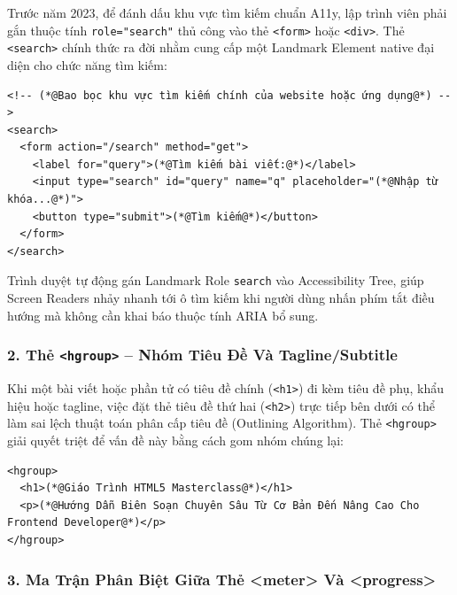 \documentclass[11pt,oneside]{book}
\newcommand{\codeinline}[1]{\textcolor{accentOrange}{\texttt{#1}}}
\begin{document}
Trước năm 2023, để đánh dấu khu vực tìm kiếm chuẩn A11y, lập trình viên phải gắn thuộc tính \codeinline{role="search"} thủ công vào thẻ \codeinline{<form>} hoặc \codeinline{<div>}. Thẻ \codeinline{<search>} chính thức ra đời nhằm cung cấp một Landmark Element native đại diện cho chức năng tìm kiếm:

\begin{codeWindow}
\begin{lstlisting}[language=HTML5]
<!-- (*@Bao bọc khu vực tìm kiếm chính của website hoặc ứng dụng@*) -->
<search>
  <form action="/search" method="get">
    <label for="query">(*@Tìm kiếm bài viết:@*)</label>
    <input type="search" id="query" name="q" placeholder="(*@Nhập từ khóa...@*)">
    <button type="submit">(*@Tìm kiếm@*)</button>
  </form>
</search>
\end{lstlisting}
\end{codeWindow}

\begin{noteBox}
Trình duyệt tự động gán Landmark Role \codeinline{search} vào Accessibility Tree, giúp Screen Readers nhảy nhanh tới ô tìm kiếm khi người dùng nhấn phím tắt điều hướng mà không cần khai báo thuộc tính ARIA bổ sung.
\end{noteBox}

\subsubsection{2. Thẻ \codeinline{<hgroup>} -- Nhóm Tiêu Đề Và Tagline/Subtitle}

Khi một bài viết hoặc phần tử có tiêu đề chính (\codeinline{<h1>}) đi kèm tiêu đề phụ, khẩu hiệu hoặc tagline, việc đặt thẻ tiêu đề thứ hai (\codeinline{<h2>}) trực tiếp bên dưới có thể làm sai lệch thuật toán phân cấp tiêu đề (Outlining Algorithm). Thẻ \codeinline{<hgroup>} giải quyết triệt để vấn đề này bằng cách gom nhóm chúng lại:

\begin{codeWindow}
\begin{lstlisting}[language=HTML5]
<hgroup>
  <h1>(*@Giáo Trình HTML5 Masterclass@*)</h1>
  <p>(*@Hướng Dẫn Biên Soạn Chuyên Sâu Từ Cơ Bản Đến Nâng Cao Cho Frontend Developer@*)</p>
</hgroup>
\end{lstlisting}
\end{codeWindow}

\subsubsection{3. Ma Trận Phân Biệt Giữa Thẻ <meter> Và <progress>}
\end{document}
